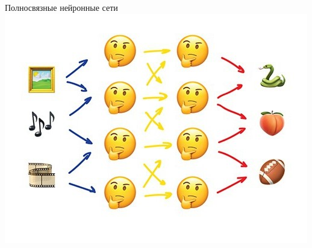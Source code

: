 \documentclass[aspectratio=169]{beamer}
\begin{document}
\begin{frame}{Полносвязные нейронные сети}
    \centering
    \includegraphics[width=.63\linewidth]{figures/fig14.jpg}
\end{frame}
\end{document}
